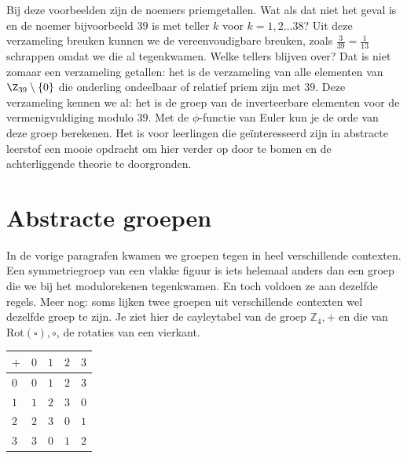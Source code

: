 \begin{multicols}{2}
Bij deze voorbeelden zijn de noemers priemgetallen. Wat als dat niet het geval is en de noemer bijvoorbeeld $39$ is met teller $k$ voor $k=1, 2 \ldots 38$? Uit deze verzameling breuken kunnen we de vereenvoudigbare breuken, zoals $\frac{3}{39}=\frac{1}{13}$ schrappen omdat we die al tegenkwamen. Welke tellers blijven over? Dat is niet zomaar een verzameling getallen: het is de verzameling van alle elementen van  $\Z_{39}\setminus \{0\}$ die onderling ondeelbaar of relatief priem zijn met $39$. Deze verzameling kennen we al: het is de groep van de inverteerbare elementen voor de vermenigvuldiging modulo $39$. Met de $\phi$-functie van Euler kun je de orde van deze groep berekenen. Het is voor leerlingen die geïnteresseerd zijn in abstracte leerstof een mooie opdracht om hier verder op door te bomen en de achterliggende theorie te doorgronden.
	  
	  








	
	
	
	
\section{Abstracte groepen}
	
	In de vorige paragrafen kwamen we groepen tegen in heel verschillende contexten. Een symmetriegroep van een vlakke figuur is iets helemaal anders dan een groep die we bij het modulorekenen tegenkwamen. En toch voldoen ze aan dezelfde regels. Meer nog: soms lijken twee groepen uit verschillende contexten wel dezelfde groep te zijn. Je ziet hier de cayleytabel van de groep $\mathbb{Z}_4, +$ en die van $\text{Rot}(\square),\circ$, de rotaties van een vierkant.
	
\begin{center}
		
\begin{tabel}

    \setlength{\extrarowheight}{2pt}

		\begin{tabular}{| C{1cm} | C{1cm}| C{1cm}| C{1cm} |C{1cm}| } 
		\hline
		 $+$ & $0$ & $1$ & $2$ & $3$ \\
			\hline
 			 $0$ & $0$ & $1$ &$2$ & $3$\\
			 $1$ & $1$ & $2$ & $3$ &$0$ \\
			 $2$ & $2$ & $3$ & $0$ & $1$ \\
			 $3$ & $3$ & $0$ & $1$ & $2$ \\
			 \hline
		\end{tabular}		
		

\end{tabel}
\end{center}
\end{multicols}
